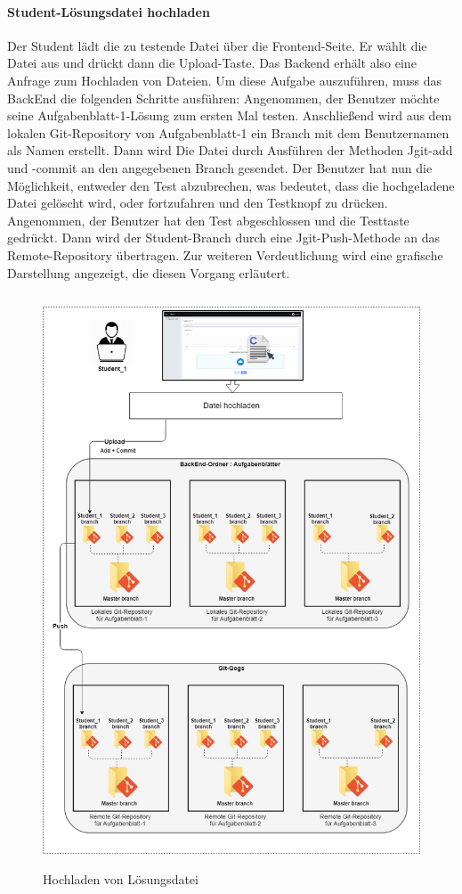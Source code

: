 \documentclass[a4paper,12pt,oneside]{book}
\begin{document}
\paragraph{Student-Lösungsdatei hochladen}
Der Student lädt die zu testende Datei über die Frontend-Seite. Er wählt die Datei aus und drückt dann die Upload-Taste. Das Backend erhält also eine Anfrage zum Hochladen von Dateien. Um diese Aufgabe auszuführen, muss das BackEnd die folgenden Schritte ausführen: Angenommen, der Benutzer möchte seine Aufgabenblatt-1-Lösung zum ersten Mal testen. Anschließend wird aus dem lokalen Git-Repository von Aufgabenblatt-1 ein Branch mit dem Benutzernamen als Namen erstellt. Dann wird Die Datei durch Ausführen der Methoden Jgit-add und -commit an den angegebenen Branch gesendet. Der Benutzer hat nun die Möglichkeit, entweder den Test abzubrechen, was bedeutet, dass die hochgeladene Datei gelöscht wird, oder fortzufahren und den Testknopf zu drücken. Angenommen, der Benutzer hat den Test abgeschlossen und die Testtaste gedrückt. Dann wird der Student-Branch durch eine Jgit-Push-Methode an das Remote-Repository übertragen. Zur weiteren Verdeutlichung wird eine grafische Darstellung angezeigt, die diesen Vorgang erläutert.
\begin{figure}[h!]
	\begin{center}
		\includegraphics[width=15cm, height=17cm]{Loesungupload.jpg}
		\caption{Hochladen von Lösungsdatei} 
		\label{ Hochladen von Lösungsdatei } 
	\end{center}
\end{figure}
\end{document}
